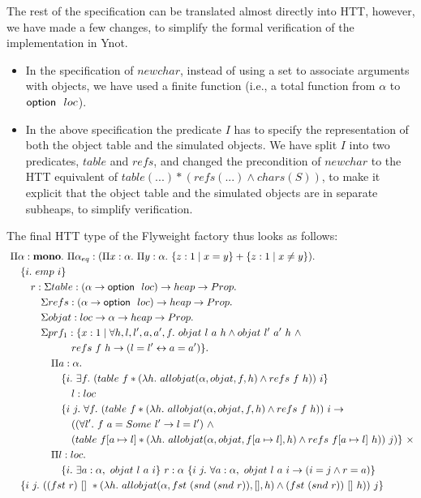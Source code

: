 The rest of the specification can be translated almost directly into HTT,
however, we have made a few changes, to simplify the formal verification of the
implementation in Ynot. 
\begin{itemize}
\item In the specification of $newchar$, instead of using a set to associate
arguments with objects, we have used a finite function (i.e., a total function
from $\alpha$ to $\mbox{\textsf{{option }}}{\ }loc$).
\item In the above specification the predicate $I$ has to specify the
representation of both the object table and the simulated objects. We have
split $I$ into two predicates, $table$ and $refs$, and changed the precondition
of $newchar$ to the HTT equivalent of $table(...) * (refs(...) \land
chars(S))$, to make it explicit that the object table and the simulated objects
are in separate subheaps, to simplify verification.
\end{itemize}
The final HTT type of the Flyweight factory thus looks as follows:
\begin{align*}
&\Pi \alpha : \MONO.\ \Pi \alpha_{eq} : (\Pi x : \alpha.\ \Pi y : \alpha.\ \{ z : 1 \mid x = y \} + \{ z : 1 \mid x \neq y \}).\\
&\quad\{ i.\ emp\ i \}\\
&\quad\quad r : \Sigma table : (\alpha \rightarrow \opttype\ \LOC) \rightarrow \HEAP \rightarrow \PROP.\\
&\quad\quad\quad \Sigma refs : (\alpha \rightarrow \opttype\ \LOC) \rightarrow \HEAP \rightarrow \PROP.\\
&\quad\quad\quad \Sigma objat : \LOC \rightarrow \alpha \rightarrow \HEAP \rightarrow \PROP.\\
&\quad\quad\quad\Sigma prf_1 : \{ x : 1 \mid \forall h, l, l', a, a', f.\ objat\ l\ a\ h \land objat\ l'\ a'\ h\ \land\\
&\quad\quad\quad\quad\quad\quad  refs\ f\ h \rightarrow (l = l' \leftrightarrow a = a') \}.\\
&\quad\quad\quad\quad \Pi a : \alpha.\\
&\quad\quad\quad\quad\quad \{ i.\ \exists f.\ (table\ f * (\lambda h.\ allobjat(\alpha, objat, f, h) \land refs\ f\ h))\ i \}\\
&\quad\quad\quad\quad\quad\quad l : \LOC\\
&\quad\quad\quad\quad\quad \{ i\ j.\ \forall f.\ (table\ f * (\lambda h.\ allobjat(\alpha, objat, f, h) \land refs\ f\ h))\ i \rightarrow\\
&\quad\quad\quad\quad\quad\quad ((\forall l'.\ f\ a = Some\ l' \rightarrow l = l')\ \land\\
&\quad\quad\quad\quad\quad\quad (table\ f[a \mapsto l] * (\lambda h.\ allobjat(\alpha, objat, f[a \mapsto l], h) \land refs\ f[a \mapsto l]\ h))\ j) \}\ \times\\
&\quad\quad\quad\quad \Pi l : loc.\\
&\quad\quad\quad\quad\quad \{ i.\ \exists a : \alpha,\ objat\ l\ a\ i \}\ r : \alpha\ \{ i\ j.\ \forall a : \alpha,\ objat\ l\ a\ i \rightarrow (i = j \land r = a) \}\\\
&\quad \{ i\ j.\ ((fst\ r)\ []\ * (\lambda h.\ allobjat(\alpha, fst\ (snd\ (snd\ r)), [], h) \land (fst\ (snd\ r))\ []\ h))\ j \}
\end{align*}
